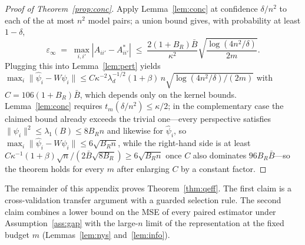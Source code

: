 \documentclass{article}
\theoremstyle{definition}
\theoremstyle{plain}
\begin{document}
\begin{proof}[Proof of Theorem~\ref{prop:conc}]
Apply Lemma~\ref{lem:conc} at
confidence $\delta/n^2$ to each of the at most $n^2$ model pairs; a union bound gives,
with probability at least $1-\delta$,
\[
\varepsilon_\infty\;=\;\max_{i,i'}|A_{ii'}-A^*_{ii'}|
\;\le\;\frac{2(1+B_R)\bar B}{\kappa^{2}}\sqrt{\frac{\log(4n^{2}/\delta)}{2m}}.
\]
Plugging this into Lemma~\ref{lem:pert} yields
$\max_i\|\hat\psi_i-W\psi_i\|\le
C\kappa^{-2}\lambda_d^{-1/2}(1+\beta)\,n\sqrt{\log(4n^{2}/\delta)/(2m)}$ with
$C=106(1+B_R)\bar B$, which depends only on the kernel bounds. Lemma~\ref{lem:conc}
requires $t_m(\delta/n^2)\le\kappa/2$; in the complementary case the claimed bound
already exceeds the trivial one---every perspective satisfies
$\|\psi_i\|^2\le\lambda_1(B)\le 8B_Rn$ and likewise for $\hat\psi_i$, so
$\max_i\|\hat\psi_i-W\psi_i\|\le6\sqrt{B_Rn}$, while the right-hand side is at least
$C\kappa^{-1}(1+\beta)\sqrt{n}/(2\bar B\sqrt{8B_R})\ge6\sqrt{B_Rn}$ once $C$ also dominates
$96B_R\bar B$---so the theorem holds for every $m$ after enlarging $C$ by a constant
factor.
\end{proof}

The remainder of this appendix proves Theorem~\ref{thm:qeff}. The first claim is a
cross-validation transfer argument with a guarded selection rule. The second claim
combines a lower bound on the MSE of every paired estimator under
Assumption~\ref{ass:gap} with the large-$n$ limit of the representation at the fixed
budget $m$ (Lemmas~\ref{lem:nys} and~\ref{lem:info}).
\end{document}
